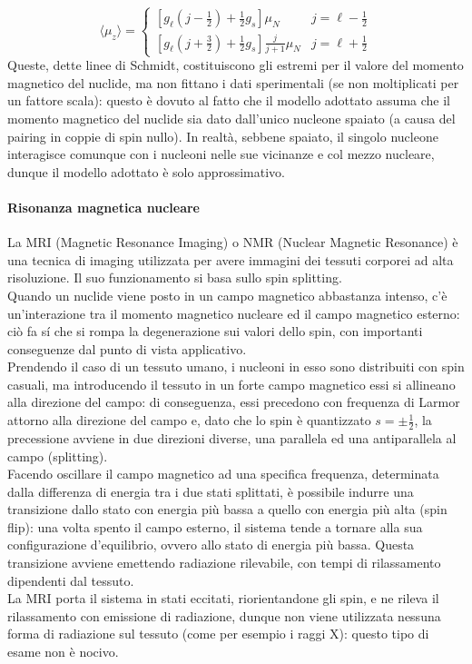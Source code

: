 \begin{equation}
	\langle \mu_z \rangle =
	\begin{cases}
		\left[ g_{\ell} \left( j - \frac{1}{2} \right) + \frac{1}{2} g_s \right] \mu_N & j = \ell - \frac{1}{2} \\
		\left[ g_{\ell} \left( j + \frac{3}{2} \right) + \frac{1}{2} g_s \right] \frac{j}{j + 1} \mu_N & j = \ell + \frac{1}{2}
	\end{cases}
	\label{eq:1.41}
\end{equation}
Queste, dette linee di Schmidt, costituiscono gli estremi per il valore del momento magnetico del nuclide, ma non fittano i dati sperimentali (se non moltiplicati per un fattore scala): questo è dovuto al fatto che il modello adottato assuma che il momento magnetico del nuclide sia dato dall'unico nucleone spaiato (a causa del pairing in coppie di spin nullo). In realtà, sebbene spaiato, il singolo nucleone interagisce comunque con i nucleoni nelle sue vicinanze e col mezzo nucleare, dunque il modello adottato è solo approssimativo.

\paragraph{Risonanza magnetica nucleare}

La MRI (Magnetic Resonance Imaging) o NMR (Nuclear Magnetic Resonance) è una tecnica di imaging utilizzata per avere immagini dei tessuti corporei ad alta risoluzione. Il suo funzionamento si basa sullo spin splitting.\\
Quando un nuclide viene posto in un campo magnetico abbastanza intenso, c'è un'interazione tra il momento magnetico nucleare ed il campo magnetico esterno: ciò fa sí che si rompa la degenerazione sui valori dello spin, con importanti conseguenze dal punto di vista applicativo.\\
Prendendo il caso di un tessuto umano, i nucleoni in esso sono distribuiti con spin casuali, ma introducendo il tessuto in un forte campo magnetico essi si allineano alla direzione del campo: di conseguenza, essi precedono con frequenza di Larmor \footnotemark attorno alla direzione del campo e, dato che lo spin è quantizzato $ s = \pm\frac{1}{2} $, la precessione avviene in due direzioni diverse, una parallela ed una antiparallela al campo (splitting).\\
Facendo oscillare il campo magnetico ad una specifica frequenza, determinata dalla differenza di energia tra i due stati splittati, è possibile indurre una transizione dallo stato con energia più bassa a quello con energia più alta (spin flip): una volta spento il campo esterno, il sistema tende a tornare alla sua configurazione d'equilibrio, ovvero allo stato di energia più bassa. Questa transizione avviene emettendo radiazione rilevabile, con tempi di rilassamento dipendenti dal tessuto.\\
La MRI porta il sistema in stati eccitati, riorientandone gli spin, e ne rileva il rilassamento con emissione di radiazione, dunque non viene utilizzata nessuna forma di radiazione sul tessuto (come per esempio i raggi X): questo tipo di esame non è nocivo.

